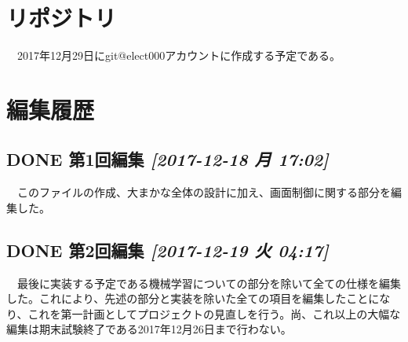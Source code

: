 \documentclass{scrartcl}
\begin{document}
\section{リポジトリ}
\label{sec:org94b1cc0}
　2017年12月29日にgit@elect000アカウントに作成する予定である。\\

\section{編集履歴}
\label{sec:orgec42576}
\subsection{{\bfseries\sffamily DONE} 第1回編集 \textit{[2017-12-18 月 17:02]}}
\label{sec:orga02b82b}
　このファイルの作成、大まかな全体の設計に加え、画面制御に関する部分を編集した。\\
\subsection{{\bfseries\sffamily DONE} 第2回編集 \textit{[2017-12-19 火 04:17]}}
\label{sec:org08a88be}
　最後に実装する予定である機械学習についての部分を除いて全ての仕様を編集した。これにより、先述の部分と実装を除いた全ての項目を編集したことになり、これを第一計画としてプロジェクトの見直しを行う。尚、これ以上の大幅な編集は期末試験終了である2017年12月26日まで行わない。\\
\end{document}
